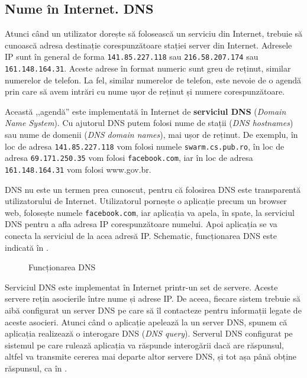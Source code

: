\subsection{Nume în Internet. DNS}
\label{sec:net:internet:dns}

Atunci când un utilizator dorește să folosească un serviciu din Internet, trebuie să cunoască adresa destinație corespunzătoare stației server din Internet.
Adresele IP sunt în general de forma \texttt{141.85.227.118} sau \texttt{216.58.207.174} sau \texttt{161.148.164.31}.
Aceste adrese în format numeric sunt greu de reținut, similar numerelor de telefon.
La fel, similar numerelor de telefon, este nevoie de o agendă prin care să avem intrări cu nume ușor de reținut și numere corespunzătoare.

Această ,,agendă'' este implementată în Internet de \textbf{serviciul DNS}  (\textit{Domain Name System}).
Cu ajutorul DNS putem folosi nume de stații (\textit{DNS hostnames}) sau nume de domenii (\textit{DNS domain names}), mai ușor de reținut.
De exemplu, în loc de adresa \texttt{141.85.227.118} vom folosi numele \texttt{swarm.cs.pub.ro}, în loc de adresa \texttt{69.171.250.35} vom folosi \texttt{facebook.com}, iar în loc de adresa \texttt{161.148.164.31} vom folosi www.gov.br.

DNS nu este un termen prea cunoscut, pentru că folosirea DNS este transparentă utilizatorului de Internet.
Utilizatorul pornește o aplicație precum un browser web, folosește numele \texttt{facebook.com}, iar aplicația va apela, în spate, la serviciul DNS pentru a afla adresa IP corespunzătoare numelui.
Apoi aplicația se va conecta la serviciul de la acea adresă IP.
Schematic, funcționarea DNS este indicată în .

\begin{figure}[htbp]
  \centering
  \def\svgwidth{\columnwidth}
  
  \caption{Funcționarea DNS}
  \label{fig:net:dns}
\end{figure}

Serviciul DNS este implementat în Internet printr-un set de servere.
Aceste servere rețin asocierile între nume și adrese IP.
De aceea, fiecare sistem trebuie să aibă configurat un server DNS pe care să îl contacteze pentru informații legate de aceste asocieri.
Atunci când o aplicație apelează la un server DNS, spunem că aplicația realizează o interogare DNS (\textit{DNS query}).
Serverul DNS configurat pe sistemul pe care rulează aplicația va răspunde interogării dacă are răspunsul, altfel va transmite cererea mai departe altor servere DNS, și tot așa până obține răspunsul, ca în .

